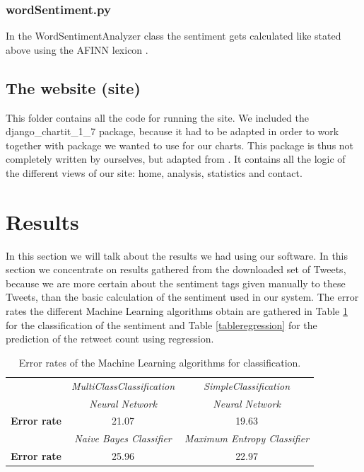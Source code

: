 \documentclass[10pt]{IEEEtran}
\begin{document}
\subsubsection{wordSentiment.py}

In the WordSentimentAnalyzer class the sentiment gets calculated like stated above using the AFINN lexicon \cite{AFINN}. 

\subsection{The website (site)}

This folder contains all the code for running the site. We included the django\_chartit\_1\_7 package, because it had to be adapted in order to work together with package we wanted to use for our charts. This package is thus not completely written by ourselves, but adapted from \cite{django}. It contains all the logic of the different views of our site: home, analysis, statistics and contact. 

\section{Results}

In this section we will talk about the results we had using our software. In this section we concentrate on results gathered from the downloaded set of Tweets, because we are more certain about the sentiment tags given manually to these Tweets, than the basic calculation of the sentiment used in our system. The error rates the different Machine Learning algorithms obtain are gathered in Table \ref{tableclassification} for the classification of the sentiment and Table \ref{tableregression} for the prediction of the retweet count using regression. 

\begin{table}[h!]
	\centering
		\begin{tabular}{ | >{\bfseries}l || c | c |}
		\hline
		& \emph{MultiClassClassification} & \emph{SimpleClassification} \\ 
		& \emph{Neural Network} & \emph{Neural Network} \\
		\hline
		\hline
		Error rate & 21.07 & 19.63 \\ 
		\hline  
		&  \emph{Naive Bayes Classifier} &  \emph{Maximum Entropy Classifier} \\
		\hline
		\hline
		Error rate &  25.96 & 22.97 \\
		\hline
		\end{tabular}
    \caption{Error rates of the Machine Learning algorithms for classification.}
    \label{tableclassification}
\end{table} 
\end{document}

